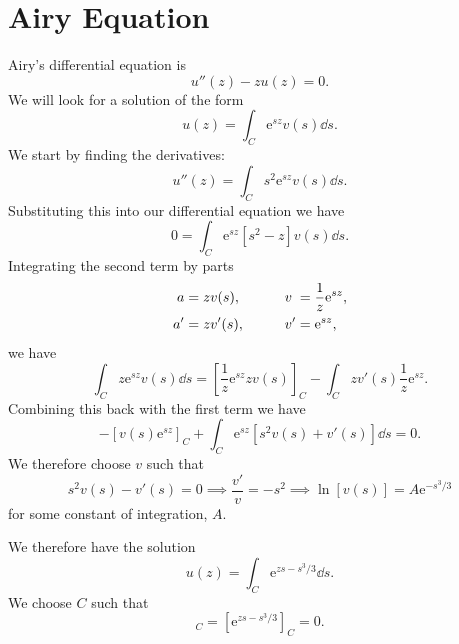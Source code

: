 \documentclass[fleqn]{NotesClass}
\newcommand*{\e}{\mathrm{e}}
\begin{document}
    \section{Airy Equation}
    Airy's differential equation is
    \begin{equation}
        u''(z) - zu(z) = 0.
    \end{equation}
    We will look for a solution of the form
    \begin{equation}
        u(z) = \int_C \e^{sz}v(s)\dd{s}.
    \end{equation}
    We start by finding the derivatives:
    \begin{equation}
        u''(z) = \int_C s^2\e^{sz}v(s) \dd{s}.
    \end{equation}
    Substituting this into our differential equation we have
    \begin{equation}
        0 = \int_C \e^{sz}[s^2 - z]v(s) \dd{s}.
    \end{equation}
    Integrating the second term by parts
    \begin{alignat}{2}
        a &= zv(s), \qquad & v\hphantom{'} &= \frac{1}{z}\e^{sz},\\
        a' &= zv'(s), \qquad & v' &= \e^{sz},
    \end{alignat}
    we have
    \begin{equation}
        \int_{C} z\e^{sz}v(s) \dd{s} = \left[ \frac{1}{z}\e^{sz}zv(s) \right]_C - \int_C zv'(s)\frac{1}{z}\e^{sz}.
    \end{equation}
    Combining this back with the first term we have
    \begin{equation}
        -[v(s)\e^{sz}]_C + \int_C \e^{sz}[s^2v(s) + v'(s)]\dd{s} = 0.
    \end{equation}
    We therefore choose \(v\) such that
    \begin{equation}
        s^2v(s) - v'(s) = 0 \implies \frac{v'}{v} = -s^2 \implies \ln [v(s)] = A\e^{-s^3/3}
    \end{equation}
    for some constant of integration, \(A\).
    
    We therefore have the solution
    \begin{equation}
        u(z) = \int_C \e^{zs - s^3/3} \dd{s}.
    \end{equation}
    We choose \(C\) such that
    \begin{equation}
        [v(s)\e^{sz}]_C = [\e^{zs - s^3/3}]_C = 0.
    \end{equation}
    
\end{document}
